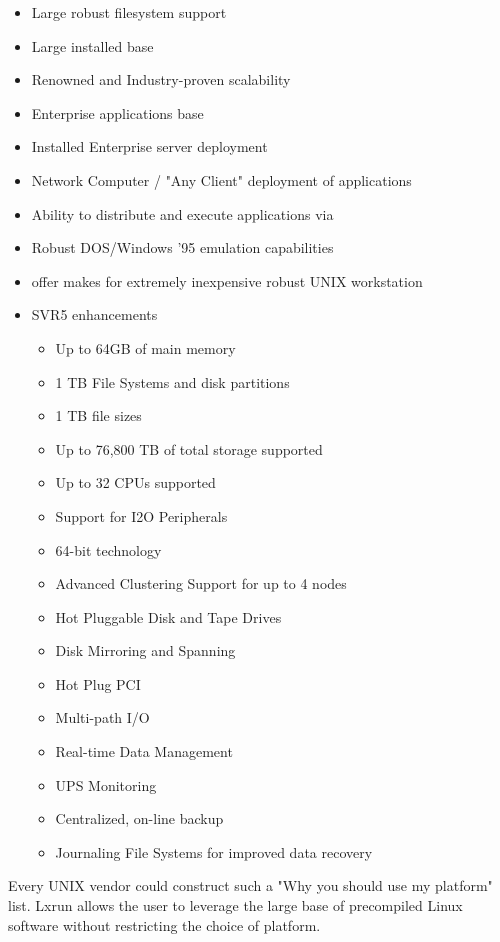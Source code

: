 \documentclass[letterpaper]{article}
\begin{document}
\begin{itemize}
\item Large robust filesystem support
\item Large installed base
\item Renowned and Industry-proven scalability
\item Enterprise applications base
\item Installed Enterprise server deployment
\item Network Computer / "Any Client" deployment of applications
\item Ability to distribute and execute applications via 
\item Robust DOS/Windows '95 emulation capabilities
\item {}
offer makes for extremely inexpensive robust UNIX workstation
\item SVR5 enhancements
\begin{itemize}
\item Up to 64GB of main memory 
\item 1 TB File Systems and disk partitions 
\item 1 TB file sizes 
\item Up to 76,800 TB of total storage supported 
\item Up to 32 CPUs supported 
\item Support for I2O Peripherals 
\item 64-bit technology
\item Advanced Clustering Support for up to 4 nodes 
\item Hot Pluggable Disk and Tape Drives 
\item Disk Mirroring and Spanning 
\item Hot Plug PCI 
\item Multi-path I/O 
\item Real-time Data Management 
\item UPS Monitoring
\item Centralized, on-line backup
\item Journaling File Systems for improved data recovery
\end{itemize}
\end{itemize}


Every UNIX vendor could construct such a "Why you should use my
platform" list.  Lxrun allows the user to leverage the large base
of precompiled Linux software without restricting the choice of platform.
\end{document}
